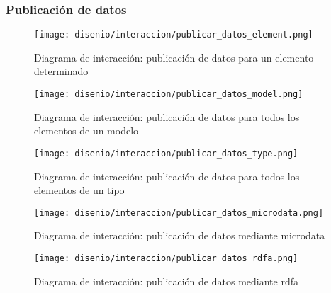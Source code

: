 \newpage

\subsubsection{Publicación de datos}

\begin{figure}[H]
    \begin{center}
        \texttt{[image: disenio/interaccion/publicar\_datos\_element.png]}
    \end{center}
    \caption{Diagrama de interacción: publicación de datos para un elemento determinado}
    \label{fig:publicar_datos_element}
\end{figure}

\newpage

\begin{figure}[H]
    \begin{center}
        \texttt{[image: disenio/interaccion/publicar\_datos\_model.png]}
    \end{center}
    \caption{Diagrama de interacción: publicación de datos para todos los elementos de un modelo}
    \label{fig:publicar_datos_model}
\end{figure}

\newpage

\begin{figure}[H]
    \begin{center}
        \texttt{[image: disenio/interaccion/publicar\_datos\_type.png]}
    \end{center}
    \caption{Diagrama de interacción: publicación de datos para todos los elementos de un tipo}
    \label{fig:publicar_datos_type}
\end{figure}

\newpage

\begin{figure}[H]
    \vspace{4cm}
    \begin{center}
        \texttt{[image: disenio/interaccion/publicar\_datos\_microdata.png]}
    \end{center}
    \caption{Diagrama de interacción: publicación de datos mediante microdata}
    \label{fig:publicar_datos_microdata}
\end{figure}

\newpage

\begin{figure}[H]
    \vspace{2cm}
    \begin{center}
        \texttt{[image: disenio/interaccion/publicar\_datos\_rdfa.png]}
    \end{center}
    \caption{Diagrama de interacción: publicación de datos mediante rdfa}
    \label{fig:publicar_datos_rdfa}
\end{figure}

